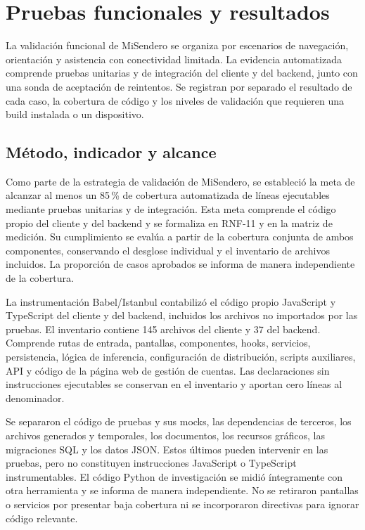 \section{Pruebas funcionales y resultados}\label{sec:pruebas-funcionales}

La validación funcional de MiSendero se organiza por escenarios de navegación, orientación y asistencia con conectividad limitada. La evidencia automatizada comprende pruebas unitarias y de integración del cliente y del backend, junto con una sonda de aceptación de reintentos. Se registran por separado el resultado de cada caso, la cobertura de código y los niveles de validación que requieren una build instalada o un dispositivo.

\subsection{Método, indicador y alcance}

Como parte de la estrategia de validación de MiSendero, se estableció la meta de alcanzar al menos un 85\,\% de cobertura automatizada de líneas ejecutables mediante pruebas unitarias y de integración. Esta meta comprende el código propio del cliente y del backend y se formaliza en RNF-11 y en la matriz de medición. Su cumplimiento se evalúa a partir de la cobertura conjunta de ambos componentes, conservando el desglose individual y el inventario de archivos incluidos. La proporción de casos aprobados se informa de manera independiente de la cobertura.

La instrumentación Babel/Istanbul contabilizó el código propio JavaScript y TypeScript del cliente y del backend, incluidos los archivos no importados por las pruebas. El inventario contiene 145 archivos del cliente y 37 del backend. Comprende rutas de entrada, pantallas, componentes, hooks, servicios, persistencia, lógica de inferencia, configuración de distribución, scripts auxiliares, API y código de la página web de gestión de cuentas. Las declaraciones sin instrucciones ejecutables se conservan en el inventario y aportan cero líneas al denominador.

Se separaron el código de pruebas y sus mocks, las dependencias de terceros, los archivos generados y temporales, los documentos, los recursos gráficos, las migraciones SQL y los datos JSON. Estos últimos pueden intervenir en las pruebas, pero no constituyen instrucciones JavaScript o TypeScript instrumentables. El código Python de investigación se midió íntegramente con otra herramienta y se informa de manera independiente. No se retiraron pantallas o servicios por presentar baja cobertura ni se incorporaron directivas para ignorar código relevante.

